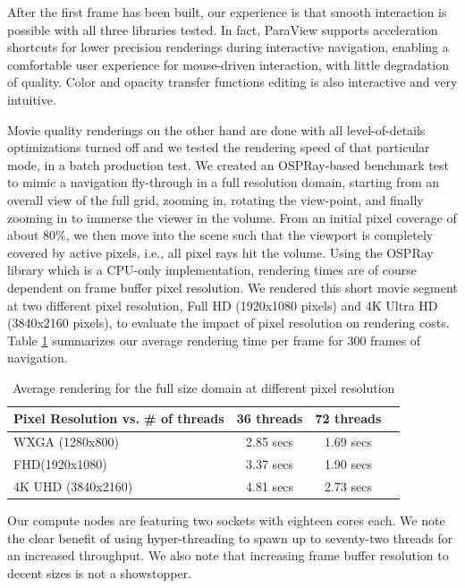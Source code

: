 \documentclass[final,5p,times,twocolumn]{elsarticle}
\begin{document}
After the first frame has been built, our experience is that smooth interaction
is possible with all three libraries tested. In fact, ParaView supports acceleration
shortcuts for lower precision renderings during interactive navigation,
enabling a comfortable user experience for mouse-driven interaction,
with little degradation of quality. 
Color and opacity transfer functions editing is also interactive and very intuitive.

Movie quality renderings on the other hand are done with all level-of-details optimizations turned off and we tested the rendering speed of that particular mode, in a batch production test.
We created an OSPRay-based benchmark test to mimic a navigation fly-through in
a full resolution domain, starting from an overall view of the full grid, zooming in, rotating
the view-point, and finally zooming in to immerse the viewer in the volume. From
an initial pixel coverage of about 80\%, we then move into the scene such that
the viewport is completely covered by active pixels, i.e., all pixel rays hit the volume.  Using the OSPRay library which is a CPU-only implementation, rendering times are of course dependent on frame buffer pixel resolution. We rendered this short movie segment at two different pixel resolution, Full HD (1920x1080 pixels) and 4K Ultra HD (3840x2160 pixels), to evaluate the impact of pixel resolution on rendering costs.
Table \ref{tab:osprayThreads} summarizes
our average rendering time per frame for 300 frames of navigation.

\begin{table}[htb]
  \centering
  \caption{
    Average rendering for the full size domain at different pixel resolution
  }
  \label{tab:osprayThreads}

  \begin{tabular}{lccc}
    \hline
    Pixel Resolution vs. \# of threads  & 36 threads & 72 threads\\
    \hline
    WXGA (1280x800) & 2.85 secs &  1.69 secs \\
    FHD(1920x1080) & 3.37 secs &  1.90 secs \\
    4K UHD (3840x2160) & 4.81 secs &  2.73 secs \\
    \hline

  \end{tabular}
\end{table}

Our compute nodes are featuring two sockets with eighteen cores each. We note the clear benefit of using hyper-threading to spawn up to seventy-two threads for an increased throughput. We also note that increasing frame buffer resolution to decent sizes is not a showstopper. 
\end{document}
